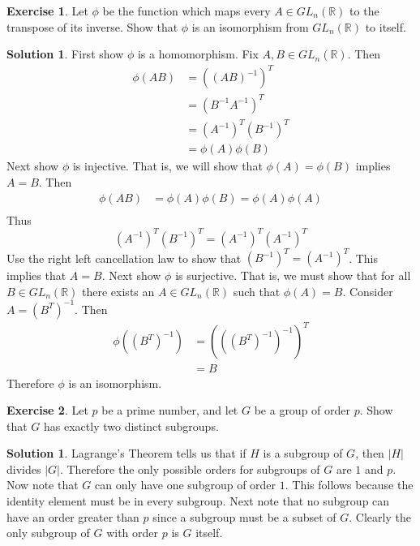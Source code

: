 \documentclass[12pt]{article}
\theoremstyle{definition}
\newtheorem{exercise}{Exercise}
\theoremstyle{definition}
\newtheorem{solution}[theorem]{Solution}
\begin{document}
\begin{exercise}
Let $\phi$ be the function which maps every $A \in GL_n(\mathbb{R})$ to the transpose of its inverse. Show that $\phi$ is an isomorphism from $GL_n(\mathbb{R})$ to itself.
\end{exercise}
\begin{solution}
First show $\phi$ is a homomorphism. Fix $A, B \in GL_n(\mathbb{R})$. Then
\begin{align*}
\phi(AB) &= ((AB)^{-1})^T \\
&= (B^{-1}A^{-1})^T \\
&= (A^{-1})^T (B^{-1})^T \\
&= \phi(A)\phi(B)
\end{align*}
Next show $\phi$ is injective. That is, we will show that $\phi(A) = \phi(B)$ implies $A = B$. Then
\begin{align*}
\phi(AB) &= \phi(A) \phi(B) = \phi(A) \phi(A) \\
\end{align*}
Thus
\begin{equation}
(A^{-1})^T (B^{-1})^T = (A^{-1})^T (A^{-1})^T 
\end{equation}
Use the right left cancellation law to show that $(B^{-1})^T = (A^{-1})^T$. This implies that $A = B$. Next show $\phi$ is surjective. That is, we must show that for all $B \in GL_n(\mathbb{R})$ there exists an $A \in GL_n(\mathbb{R})$ such that $\phi(A) = B$. Consider $A = (B^T)^{-1}$. Then
\begin{align}
\phi((B^T)^{-1}) &= (((B^T)^{-1})^{-1})^T \\
&= B
\end{align}
Therefore $\phi$ is an isomorphism.
\end{solution}

\begin{exercise}
Let $p$ be a prime number, and let $G$ be a group of order $p$. Show that $G$ has exactly two distinct subgroups. 
\end{exercise}
\begin{solution}
Lagrange's Theorem tells us that if $H$ is a subgroup of $G$, then $|H|$ divides $|G|$. Therefore the only possible orders for subgroups of $G$ are $1$ and $p$. Now note that $G$ can only have one subgroup of order $1$. This follows because the identity element must be in every subgroup. Next note that no subgroup can have an order greater than $p$ since a subgroup must be a subset of $G$. Clearly the only subgroup of $G$ with order $p$ is $G$ itself.  
\end{solution}
\end{document}
